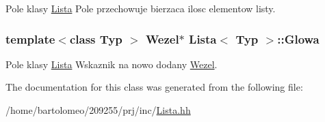 Pole klasy \hyperlink{class_lista}{Lista} Pole przechowuje bierzaca ilosc elementow listy. 

\hypertarget{class_lista_a771f55b84b2b9b3bee3fd68db71e273a}{
\subsubsection[{Glowa}]{\setlength{\rightskip}{0pt plus 5cm}template$<$class Typ $>$ {\bf Wezel}$\ast$ {\bf Lista}$<$ Typ $>$\-::Glowa\hspace{0.3cm}{\ttfamily [private]}}}\label{class_lista_a771f55b84b2b9b3bee3fd68db71e273a}


Pole klasy \hyperlink{class_lista}{Lista} Wskaznik na nowo dodany \hyperlink{struct_lista_1_1_wezel}{Wezel}. 



The documentation for this class was generated from the following file\-:\begin{DoxyCompactItemize}
\item 
/home/bartolomeo/209255/prj/inc/\hyperlink{_lista_8hh}{Lista.\-hh}\end{DoxyCompactItemize}
